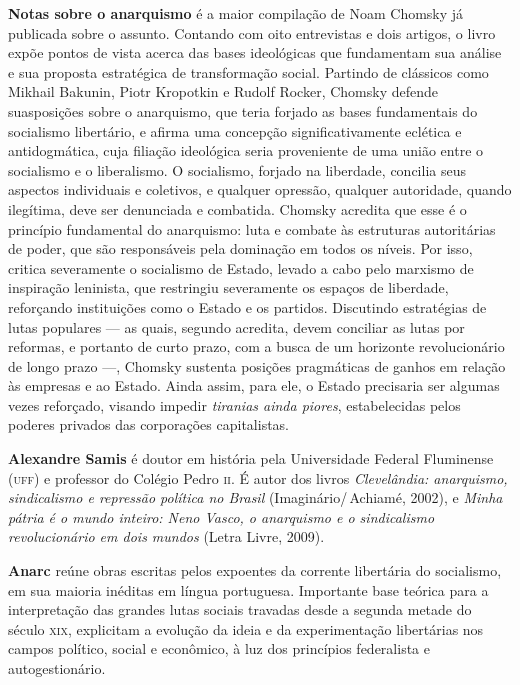 \textbf{Notas sobre o anarquismo} é a maior compilação de Noam Chomsky já publicada sobre o assunto. Contando com oito entrevistas e dois artigos, o livro expõe pontos de vista acerca das bases ideológicas que fundamentam sua análise e sua proposta estratégica de transformação social. Partindo de clássicos como Mikhail Bakunin, Piotr Kropotkin e Rudolf Rocker, Chomsky defende suasposições sobre o anarquismo, que teria forjado as bases fundamentais do socialismo libertário, e afirma uma concepção significativamente eclética e antidogmática, cuja filiação ideológica seria proveniente de uma união entre o socialismo e o liberalismo. O socialismo, forjado na liberdade, concilia seus aspectos individuais e coletivos, e qualquer opressão, qualquer autoridade, quando ilegítima, deve ser denunciada e combatida. Chomsky acredita que esse é o princípio fundamental do anarquismo: luta e combate às estruturas autoritárias de poder, que são responsáveis pela dominação em todos os níveis. Por isso, critica severamente o socialismo de Estado, levado a cabo pelo marxismo de inspiração leninista, que restringiu severamente os espaços de liberdade, reforçando instituições como o Estado e os partidos. Discutindo estratégias de lutas populares --- as quais, segundo acredita, devem conciliar as lutas por reformas, e portanto de curto prazo, com a busca de um horizonte revolucionário de longo prazo ---, Chomsky sustenta posições pragmáticas de ganhos em relação às empresas e ao Estado. Ainda assim, para ele, o Estado precisaria ser algumas vezes reforçado, visando impedir \textit{tiranias ainda piores}, estabelecidas pelos poderes privados das corporações capitalistas.

\textbf{Alexandre Samis} é doutor em história pela Universidade Federal Fluminense (\textsc{uff}) e professor do Colégio Pedro \textsc{ii}. É autor dos livros \textit{Clevelândia: anarquismo, sindicalismo e repressão política no Brasil} (Imaginário/\,Achiamé, 2002), e \textit{Minha pátria é o mundo inteiro: Neno Vasco, o anarquismo e o sindicalismo revolucionário em dois mundos} (Letra Livre, 2009).

\textbf{Anarc} reúne obras escritas pelos expoentes da corrente libertária do socialismo, em sua maioria inéditas em língua portuguesa. Importante base teórica para a interpretação das grandes lutas sociais travadas desde a segunda metade do século \textsc{xix}, explicitam a evolução da ideia e da experimentação libertárias nos campos político, social e econômico, à luz dos princípios federalista e autogestionário.


